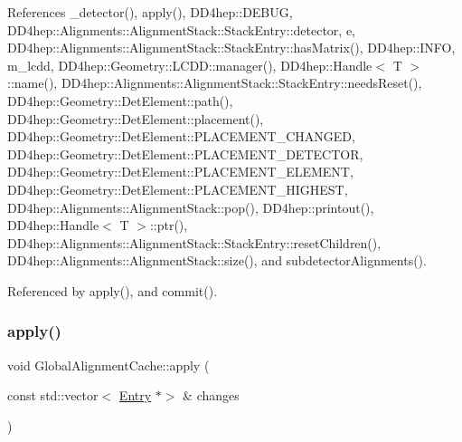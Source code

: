 References \+\_\+detector(), apply(), D\+D4hep\+::\+D\+E\+B\+UG, D\+D4hep\+::\+Alignments\+::\+Alignment\+Stack\+::\+Stack\+Entry\+::detector, e, D\+D4hep\+::\+Alignments\+::\+Alignment\+Stack\+::\+Stack\+Entry\+::has\+Matrix(), D\+D4hep\+::\+I\+N\+FO, m\+\_\+lcdd, D\+D4hep\+::\+Geometry\+::\+L\+C\+D\+D\+::manager(), D\+D4hep\+::\+Handle$<$ T $>$\+::name(), D\+D4hep\+::\+Alignments\+::\+Alignment\+Stack\+::\+Stack\+Entry\+::needs\+Reset(), D\+D4hep\+::\+Geometry\+::\+Det\+Element\+::path(), D\+D4hep\+::\+Geometry\+::\+Det\+Element\+::placement(), D\+D4hep\+::\+Geometry\+::\+Det\+Element\+::\+P\+L\+A\+C\+E\+M\+E\+N\+T\+\_\+\+C\+H\+A\+N\+G\+ED, D\+D4hep\+::\+Geometry\+::\+Det\+Element\+::\+P\+L\+A\+C\+E\+M\+E\+N\+T\+\_\+\+D\+E\+T\+E\+C\+T\+OR, D\+D4hep\+::\+Geometry\+::\+Det\+Element\+::\+P\+L\+A\+C\+E\+M\+E\+N\+T\+\_\+\+E\+L\+E\+M\+E\+NT, D\+D4hep\+::\+Geometry\+::\+Det\+Element\+::\+P\+L\+A\+C\+E\+M\+E\+N\+T\+\_\+\+H\+I\+G\+H\+E\+ST, D\+D4hep\+::\+Alignments\+::\+Alignment\+Stack\+::pop(), D\+D4hep\+::printout(), D\+D4hep\+::\+Handle$<$ T $>$\+::ptr(), D\+D4hep\+::\+Alignments\+::\+Alignment\+Stack\+::\+Stack\+Entry\+::reset\+Children(), D\+D4hep\+::\+Alignments\+::\+Alignment\+Stack\+::size(), and subdetector\+Alignments().



Referenced by apply(), and commit().

\hypertarget{class_d_d4hep_1_1_alignments_1_1_global_alignment_cache_af4453c682c02be1f930aa0c5dbc8d5f0}{}\label{class_d_d4hep_1_1_alignments_1_1_global_alignment_cache_af4453c682c02be1f930aa0c5dbc8d5f0} 
\subsubsection{\texorpdfstring{apply()}{apply()}\hspace{0.1cm}{\footnotesize\ttfamily [2/2]}}
{\footnotesize\ttfamily void Global\+Alignment\+Cache\+::apply (\begin{DoxyParamCaption}\item[{const std\+::vector$<$ \hyperlink{class_d_d4hep_1_1_alignments_1_1_global_alignment_cache_a57c878d71fabf28ccab5c04f45f48fb1}{Entry} $\ast$$>$ \&}]{changes }\end{DoxyParamCaption})\hspace{0.3cm}{\ttfamily [protected]}}




